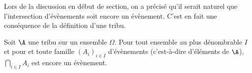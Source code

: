 \documentclass[a4paper,10pt]{report}
\begin{document}
\medskip


\vspace{0.2cm}

Lors de la discussion en début de section, on a précisé qu'il serait naturel que l'intersection d'évènements soit encore un évènement. C'est en fait une conséquence de la définition d'une tribu.

\vspace{0.2cm}


\begin{Proposition}{}
Soit $\A$ une tribu sur un ensemble $\Omega$. Pour tout ensemble au plus dénombrable $I$ et pour et toute famille $(A_i)_{i \in I}$ d'évènements (c'est-à-dire d'éléments de $\A$), $\bigcap_{i \in I} A_i$ est encore un évènement.
\end{Proposition}

\begin{Demonstration}{} 

\vspace{6cm}
%
\end{Demonstration}
%
\end{document}
